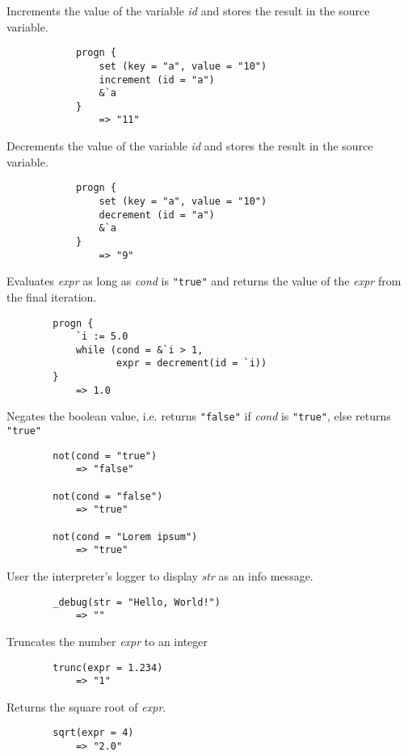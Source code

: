 \begin{multicols*}{2}
	Increments the value of the variable \textit{id} and stores the result in the source variable.
	\begin{verbatim}
			progn {
			    set (key = "a", value = "10")
			    increment (id = "a")
			    &`a
			}
			    => "11"
	\end{verbatim}
	Decrements the value of the variable \textit{id} and stores the result in the source variable.
	\begin{verbatim}
			progn {
			    set (key = "a", value = "10")
			    decrement (id = "a")
			    &`a
			}
			    => "9"
	\end{verbatim}
	Evaluates \textit{expr} as long as \textit{cond} is \verb|"true"| and returns the value of the \textit{expr}
	from the final iteration.
	\begin{verbatim}
		progn {
		    `i := 5.0
		    while (cond = &`i > 1,
		           expr = decrement(id = `i))
		}
		    => 1.0
	\end{verbatim}
	Negates the boolean value, i.e. returns \verb|"false"| if \textit{cond} is \verb|"true"|, else returns \verb|"true"|
	\begin{verbatim}
		not(cond = "true")
		    => "false"

		not(cond = "false")
		    => "true"

		not(cond = "Lorem ipsum")
		    => "true"
	\end{verbatim}
	User the interpreter's logger to display \textit{str} as an info message.
	\begin{verbatim}
		_debug(str = "Hello, World!")
		    => ""
	\end{verbatim}
	Truncates the number \textit{expr} to an integer
	\begin{verbatim}
		trunc(expr = 1.234)
		    => "1"
	\end{verbatim}
	Returns the square root of \textit{expr}.
	\begin{verbatim}
		sqrt(expr = 4)
		    => "2.0"
	\end{verbatim}
\end{multicols*}
\newpage